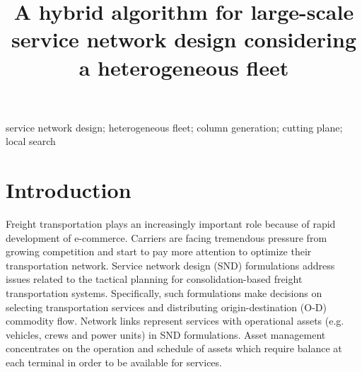 \documentclass[11pt,nonblindrev,fleqn]{article}
\newcommand{\singlespace}{\renewcommand{\baselinestretch}{1}\small\normalsize}
\newcommand{\doublespace}{\renewcommand{\baselinestretch}{1.5}\small\normalsize}
\begin{document}
\singlespace
\begin{titlepage}
\title{A hybrid algorithm for large-scale service network design considering a heterogeneous fleet}
\date{} %
\end{titlepage}
\maketitle
\vspace{-.5in}
{}

\vspace{.15in}

 service network design; heterogeneous fleet; column generation; cutting plane; local search


\doublespace
\section{Introduction}
Freight transportation plays an increasingly important role because of rapid development of e-commerce. Carriers are facing tremendous pressure from growing competition and start to pay more attention to optimize their transportation network. Service network design (SND) formulations address issues related to the tactical planning for consolidation-based freight transportation systems. Specifically, such formulations make decisions on selecting transportation services and distributing origin-destination (O-D) commodity flow. Network links represent services with operational assets (e.g. vehicles, crews and power units) in SND formulations. Asset management concentrates on the operation and schedule of assets which require balance at each terminal in order to be available for services.
\end{document}
